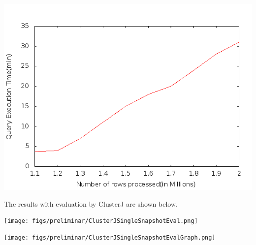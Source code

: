 \pagebreak

\begin{center}
\includegraphics[scale=0.65]{figs/preliminar/MySqlServerSingleSnapshotEvalGraph.png}
\label{fig:MySqlServerSSEGraph}%
\end{center}


The results with evaluation by ClusterJ  are shown below.\\
\begin{center}
\texttt{[image: figs/preliminar/ClusterJSingleSnapshotEval.png]}
\label{fig:ClusterJSSE}%
\end{center}

\pagebreak

\begin{center}
\texttt{[image: figs/preliminar/ClusterJSingleSnapshotEvalGraph.png]}
\label{fig:ClusterJSSEGraph}%
\end{center}







